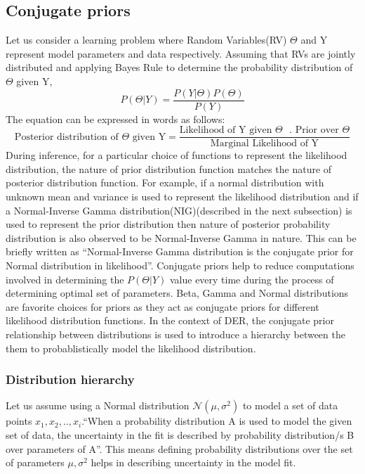 	\subsection{Conjugate priors}
	Let us consider a learning problem where Random Variables(RV) $\Theta$ and Y represent model parameters and data respectively. Assuming that RVs are jointly distributed and applying Bayes Rule to determine the probability distribution of $\Theta$ given Y,
	\begin{equation*}
		P(\Theta|Y) = \frac{P(Y|\Theta)P(\Theta)}{P(Y)}
	\end{equation*}
	The equation can be expressed in words as follows:
	\begin{equation*}
		\text{Posterior distribution of $\Theta$ given Y}=\frac{\text{Likelihood of Y given $\Theta$ }.\text{ Prior over $\Theta$}}{\text{Marginal Likelihood of Y}}
	\end{equation*}
	During inference, for a particular choice of functions to represent the likelihood distribution, the nature of prior distribution function matches the nature of posterior distribution function. For example, if a normal distribution with unknown mean and
	variance is used to represent the likelihood distribution and if a Normal-Inverse Gamma distribution(NIG)(described in the next subsection) is used to represent the prior distribution then nature of posterior probability distribution is also observed to be Normal-Inverse Gamma in nature. This can be briefly written as \enquote{Normal-Inverse Gamma distribution is the conjugate prior for Normal distribution in likelihood}.
	Conjugate priors help to reduce computations involved in determining the $P(\Theta|Y )$ value every time during the process of determining optimal set of parameters. Beta, Gamma and Normal distributions are favorite choices for priors as they act as conjugate priors for different likelihood distribution functions. In the context of DER, the conjugate prior relationship between distributions is used to introduce a hierarchy between the them to probablistically model the likelihood distribution. 
	\subsubsection{Distribution hierarchy}
	Let us assume using a Normal distribution $\mathcal{N}(\mu,\sigma^2)$ to model a set of data points $x_1,x_2,..,x_i$.\enquote{When a probability distribution A is used to model the given set of data, the uncertainty in the fit is described by probability distribution/s B over parameters of A}. This means defining probability distributions over the set of parameters $\mu,\sigma^2$ helps in describing uncertainty in the model fit.
	 
